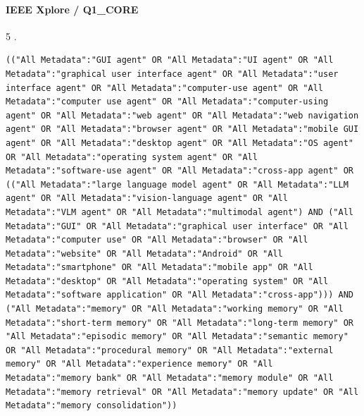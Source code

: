 \noindent\begin{minipage}{\linewidth}
\paragraph{IEEE Xplore / Q1\_CORE}
5 .
\begin{lstlisting}
(("All Metadata":"GUI agent" OR "All Metadata":"UI agent" OR "All Metadata":"graphical user interface agent" OR "All Metadata":"user interface agent" OR "All Metadata":"computer-use agent" OR "All Metadata":"computer use agent" OR "All Metadata":"computer-using agent" OR "All Metadata":"web agent" OR "All Metadata":"web navigation agent" OR "All Metadata":"browser agent" OR "All Metadata":"mobile GUI agent" OR "All Metadata":"desktop agent" OR "All Metadata":"OS agent" OR "All Metadata":"operating system agent" OR "All Metadata":"software-use agent" OR "All Metadata":"cross-app agent" OR (("All Metadata":"large language model agent" OR "All Metadata":"LLM agent" OR "All Metadata":"vision-language agent" OR "All Metadata":"VLM agent" OR "All Metadata":"multimodal agent") AND ("All Metadata":"GUI" OR "All Metadata":"graphical user interface" OR "All Metadata":"computer use" OR "All Metadata":"browser" OR "All Metadata":"website" OR "All Metadata":"Android" OR "All Metadata":"smartphone" OR "All Metadata":"mobile app" OR "All Metadata":"desktop" OR "All Metadata":"operating system" OR "All Metadata":"software application" OR "All Metadata":"cross-app"))) AND ("All Metadata":"memory" OR "All Metadata":"working memory" OR "All Metadata":"short-term memory" OR "All Metadata":"long-term memory" OR "All Metadata":"episodic memory" OR "All Metadata":"semantic memory" OR "All Metadata":"procedural memory" OR "All Metadata":"external memory" OR "All Metadata":"experience memory" OR "All Metadata":"memory bank" OR "All Metadata":"memory module" OR "All Metadata":"memory retrieval" OR "All Metadata":"memory update" OR "All Metadata":"memory consolidation"))
\end{lstlisting}
\end{minipage}\par\medskip
